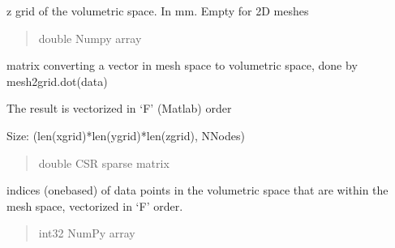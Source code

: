 \documentclass[letterpaper,10pt,english]{sphinxmanual}
\begin{document}
\begin{fulllineitems}
\begin{fulllineitems}
\end{fulllineitems}


\begin{fulllineitems}
\label{\detokenize{_autosummary/nirfasterff.base.data.meshvol:nirfasterff.base.data.meshvol.zgrid}}
\pysigstartsignatures
\pysigline
{}
\pysigstopsignatures
\sphinxAtStartPar
z grid of the volumetric space. In mm. Empty for 2D meshes
\begin{quote}\begin{description}
\sphinxAtStartPar
double Numpy array

\end{description}\end{quote}

\end{fulllineitems}


\begin{fulllineitems}
\label{\detokenize{_autosummary/nirfasterff.base.data.meshvol:nirfasterff.base.data.meshvol.mesh2grid}}
\pysigstartsignatures
\pysigline
{}
\pysigstopsignatures
\sphinxAtStartPar
matrix converting a vector in mesh space to volumetric space, done by mesh2grid.dot(data)

\sphinxAtStartPar
The result is vectorized in ‘F’ (Matlab) order

\sphinxAtStartPar
Size: (len(xgrid)*len(ygrid)*len(zgrid), NNodes)
\begin{quote}\begin{description}
\sphinxAtStartPar
double CSR sparse matrix

\end{description}\end{quote}

\end{fulllineitems}


\begin{fulllineitems}
\label{\detokenize{_autosummary/nirfasterff.base.data.meshvol:nirfasterff.base.data.meshvol.gridinmesh}}
\pysigstartsignatures
\pysigline
{}
\pysigstopsignatures
\sphinxAtStartPar
indices (one\sphinxhyphen{}based) of data points in the volumetric space that are within the mesh space, vectorized in ‘F’ order.
\begin{quote}\begin{description}
\sphinxAtStartPar
int32 NumPy array


\end{description}
\end{quote}
\end{fulllineitems}
\end{fulllineitems}
\end{document}
